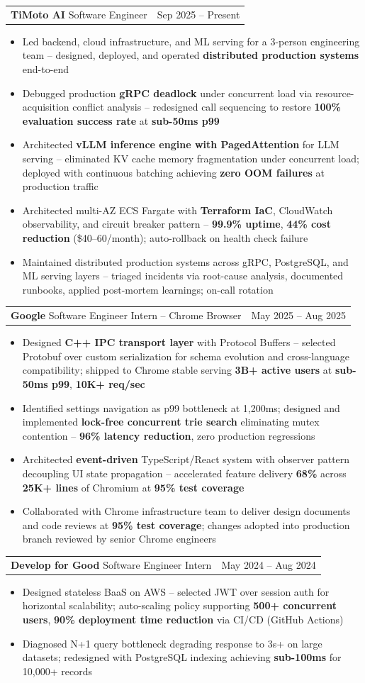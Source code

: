 \documentclass[letterpaper,11pt]{article}
\makeatletter
\newcommand{\resumeItem}[1]{
  \item\small{{#1 \vspace{-2pt}}}
}
\newcommand{\resumeSubheadingShortSplit}[3]{%
  \vspace{-2pt}\item
    \begin{tabular*}{0.98\textwidth}[t]{l@{\extracolsep{\fill}}r}
      {\normalsize\textbf{#1}} \textbar{} {\normalsize #2} & {\normalsize #3} \\
    \end{tabular*}\vspace{-7pt}
}
\newcommand{\resumeItemListStart}{\begin{itemize}}
\newcommand{\resumeItemListEnd}{\end{itemize}\vspace{-5pt}}
\makeatother
\begin{document}
    \resumeSubheadingShortSplit
      {TiMoto AI}{Software Engineer}{Sep 2025 -- Present}
        \resumeItemListStart
          \resumeItem{Led backend, cloud infrastructure, and ML serving for a 3-person engineering team -- designed, deployed, and operated \textbf{distributed production systems} end-to-end}
          \resumeItem{Debugged production \textbf{gRPC deadlock} under concurrent load via resource-acquisition conflict analysis -- redesigned call sequencing to restore \textbf{100\% evaluation success rate} at \textbf{sub-50ms p99}}
          \resumeItem{Architected \textbf{vLLM inference engine with PagedAttention} for LLM serving -- eliminated KV cache memory fragmentation under concurrent load; deployed with continuous batching achieving \textbf{zero OOM failures} at production traffic}
          \resumeItem{Architected multi-AZ ECS Fargate with \textbf{Terraform IaC}, CloudWatch observability, and circuit breaker pattern -- \textbf{99.9\% uptime}, \textbf{44\% cost reduction} (\$40--60/month); auto-rollback on health check failure}
          \resumeItem{Maintained distributed production systems across gRPC, PostgreSQL, and ML serving layers -- triaged incidents via root-cause analysis, documented runbooks, applied post-mortem learnings; on-call rotation}
      \resumeItemListEnd

    \resumeSubheadingShortSplit
      {Google}{Software Engineer Intern -- Chrome Browser}{May 2025 -- Aug 2025}
      \resumeItemListStart
        \resumeItem{Designed \textbf{C++ IPC transport layer} with Protocol Buffers -- selected Protobuf over custom serialization for schema evolution and cross-language compatibility; shipped to Chrome stable serving \textbf{3B+ active users} at \textbf{sub-50ms p99}, \textbf{10K+ req/sec}}
        \resumeItem{Identified settings navigation as p99 bottleneck at 1,200ms; designed and implemented \textbf{lock-free concurrent trie search} eliminating mutex contention -- \textbf{96\% latency reduction}, zero production regressions}
        \resumeItem{Architected \textbf{event-driven} TypeScript/React system with observer pattern decoupling UI state propagation -- accelerated feature delivery \textbf{68\%} across \textbf{25K+ lines} of Chromium at \textbf{95\% test coverage}}
        \resumeItem{Collaborated with Chrome infrastructure team to deliver design documents and code reviews at \textbf{95\% test coverage}; changes adopted into production branch reviewed by senior Chrome engineers}
      \resumeItemListEnd

    \resumeSubheadingShortSplit
      {Develop for Good}{Software Engineer Intern}{May 2024 -- Aug 2024}
      \resumeItemListStart
        \resumeItem{Designed stateless BaaS on AWS -- selected JWT over session auth for horizontal scalability; auto-scaling policy supporting \textbf{500+ concurrent users}, \textbf{90\% deployment time reduction} via CI/CD (GitHub Actions)}
        \resumeItem{Diagnosed N+1 query bottleneck degrading response to 3s+ on large datasets; redesigned with PostgreSQL indexing achieving \textbf{sub-100ms} for 10,000+ records}
      \resumeItemListEnd
\end{document}
